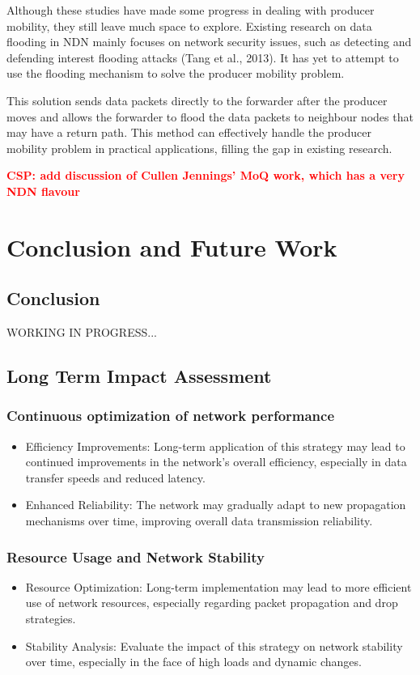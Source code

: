 \documentclass[conference]{IEEEtran}
\newcommand{\csp}[1]{\textbf{\textcolor{red}{CSP: #1}}}
\begin{document}
Although these studies have made some progress in dealing with producer mobility, they still leave much space to explore. Existing research on data flooding in NDN mainly focuses on network security issues, such as detecting and defending interest flooding attacks (Tang et al., 2013). It has yet to attempt to use the flooding mechanism to solve the producer mobility problem.

This solution sends data packets directly to the forwarder after the producer moves and allows the forwarder to flood the data packets to neighbour nodes that may have a return path. This method can effectively handle the producer mobility problem in practical applications, filling the gap in existing research.

\csp{add discussion of Cullen Jennings' MoQ work, which has a very NDN flavour}

\section{Conclusion and Future Work}
\subsection{Conclusion}
WORKING IN PROGRESS...
\subsection{Long Term Impact Assessment}
\subsubsection{Continuous optimization of network performance}
\begin{itemize}
    \item Efficiency Improvements: Long-term application of this strategy may lead to continued improvements in the network's overall efficiency, especially in data transfer speeds and reduced latency.
    \item Enhanced Reliability: The network may gradually adapt to new propagation mechanisms over time, improving overall data transmission reliability.
\end{itemize}

\subsubsection{Resource Usage and Network Stability}
\begin{itemize}
    \item Resource Optimization: Long-term implementation may lead to more efficient use of network resources, especially regarding packet propagation and drop strategies.
    \item Stability Analysis: Evaluate the impact of this strategy on network stability over time, especially in the face of high loads and dynamic changes.
\end{itemize}
\end{document}
